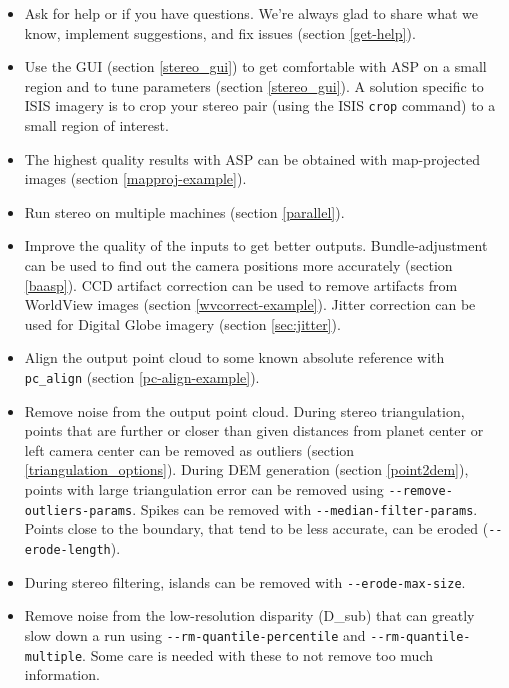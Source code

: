 \begin{itemize}
\item Ask for help or if you have questions. We're always glad to share
what we know, implement suggestions, and fix issues (section
\ref{get-help}).

\item Use the GUI (section \ref{stereo_gui}) to get comfortable with ASP
on a small region and to tune parameters (section \ref{stereo_gui}). A
solution specific to ISIS imagery is to crop your stereo pair (using the
ISIS \texttt{crop} command) to a small region of interest.

\item The highest quality results with ASP can be obtained with
  map-projected images (section \ref{mapproj-example}).

\item Run stereo on multiple machines (section \ref{parallel}).

\item Improve the quality of the inputs to get better outputs.
Bundle-adjustment can be used to find out the camera positions more
accurately (section \ref{baasp}). CCD artifact correction can be used
to remove artifacts from WorldView images (section
\ref{wvcorrect-example}). Jitter correction can be used for Digital
Globe imagery (section \ref{sec:jitter}).

\item Align the output point cloud to some known absolute reference with
\texttt{pc\_align} (section \ref{pc-align-example}).

\item Remove noise from the output point cloud. During stereo
triangulation, points that are further or closer than given distances
from planet center or left camera center can be removed as outliers
(section \ref{triangulation_options}). During DEM generation (section
\ref{point2dem}), points with large triangulation error can be removed
using \texttt{-\/-remove-outliers-params}. Spikes can be removed with
\texttt{-\/-median-filter-params}. Points close to the boundary, that
tend to be less accurate, can be eroded (\texttt{-\/-erode-length}).


\item During stereo filtering, islands can be removed with
\texttt{-\/-erode-max-size}.

\item Remove noise from the low-resolution disparity (D\_sub) that can
greatly slow down a run using  \texttt{-\/-rm-quantile-percentile} and
\texttt{-\/-rm-quantile-multiple}. Some care is needed with these to
not remove too much information.


\end{itemize}
